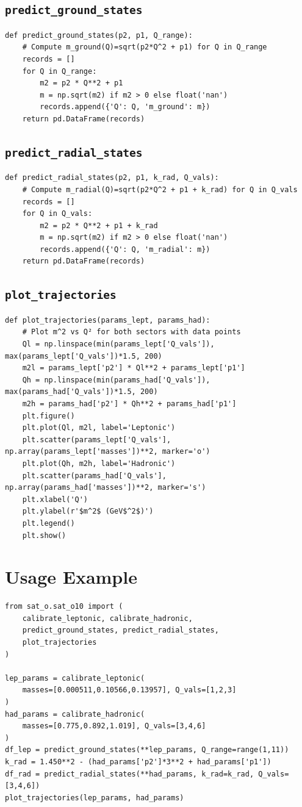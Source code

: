 \documentclass[12pt]{article}
\begin{document}
\subsection{\texttt{predict\_ground\_states}}
\begin{verbatim}
def predict_ground_states(p2, p1, Q_range):
    # Compute m_ground(Q)=sqrt(p2*Q^2 + p1) for Q in Q_range
    records = []
    for Q in Q_range:
        m2 = p2 * Q**2 + p1
        m = np.sqrt(m2) if m2 > 0 else float('nan')
        records.append({'Q': Q, 'm_ground': m})
    return pd.DataFrame(records)
\end{verbatim}

\subsection{\texttt{predict\_radial\_states}}
\begin{verbatim}
def predict_radial_states(p2, p1, k_rad, Q_vals):
    # Compute m_radial(Q)=sqrt(p2*Q^2 + p1 + k_rad) for Q in Q_vals
    records = []
    for Q in Q_vals:
        m2 = p2 * Q**2 + p1 + k_rad
        m = np.sqrt(m2) if m2 > 0 else float('nan')
        records.append({'Q': Q, 'm_radial': m})
    return pd.DataFrame(records)
\end{verbatim}

\subsection{\texttt{plot\_trajectories}}
\begin{verbatim}
def plot_trajectories(params_lept, params_had):
    # Plot m^2 vs Q² for both sectors with data points
    Ql = np.linspace(min(params_lept['Q_vals']), max(params_lept['Q_vals'])*1.5, 200)
    m2l = params_lept['p2'] * Ql**2 + params_lept['p1']
    Qh = np.linspace(min(params_had['Q_vals']), max(params_had['Q_vals'])*1.5, 200)
    m2h = params_had['p2'] * Qh**2 + params_had['p1']
    plt.figure()
    plt.plot(Ql, m2l, label='Leptonic')
    plt.scatter(params_lept['Q_vals'], np.array(params_lept['masses'])**2, marker='o')
    plt.plot(Qh, m2h, label='Hadronic')
    plt.scatter(params_had['Q_vals'], np.array(params_had['masses'])**2, marker='s')
    plt.xlabel('Q')
    plt.ylabel(r'$m^2$ (GeV$^2$)')
    plt.legend()
    plt.show()
\end{verbatim}

\section*{Usage Example}
\begin{verbatim}
from sat_o.sat_o10 import (
    calibrate_leptonic, calibrate_hadronic,
    predict_ground_states, predict_radial_states,
    plot_trajectories
)

lep_params = calibrate_leptonic(
    masses=[0.000511,0.10566,0.13957], Q_vals=[1,2,3]
)
had_params = calibrate_hadronic(
    masses=[0.775,0.892,1.019], Q_vals=[3,4,6]
)
df_lep = predict_ground_states(**lep_params, Q_range=range(1,11))
k_rad = 1.450**2 - (had_params['p2']*3**2 + had_params['p1'])
df_rad = predict_radial_states(**had_params, k_rad=k_rad, Q_vals=[3,4,6])
plot_trajectories(lep_params, had_params)
\end{verbatim}
\end{document}

